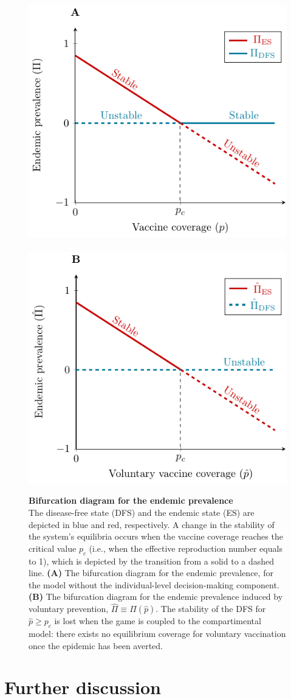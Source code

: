 \begin{figure}[H]
	\centering	
	\includegraphics[width=0.4\linewidth]{Figures/Vaccine/TikZ_Bifurcation/TranscriticalBifurcation}
	\hspace{1cm}\
	\includegraphics[width=0.4\linewidth]{Figures/Vaccine/TikZ_Bifurcation/TranscriticalBifurcation_WithGame}
	\caption[ Bifurcation diagram for the endemic prevalence]{%
		{\bf Bifurcation diagram for the endemic prevalence}\\
	The disease-free state (DFS) and the endemic state (ES) are depicted in blue and red, respectively. A change in the stability of the system's equilibria occurs when the vaccine coverage reaches the critical value $p_c$ (i.e., when the effective reproduction number equals to 1), which is depicted by the transition from a solid to a dashed line. \textbf{(A)} The bifurcation diagram for the endemic prevalence, for the model without the individual-level decision-making component. \textbf{(B)} The bifurcation diagram for the endemic prevalence induced by voluntary prevention, $\hat{\Pi} \equiv \Pi(\hat{p})$. The stability of the DFS for $\hat{p} \geq p_c$ is lost when the game is coupled to the compartimental model: there exists no equilibrium coverage for voluntary vaccination once the epidemic has been averted.}
	\label{fig:Vaccine_Bifurcation}
\end{figure}

\section{Further discussion}

